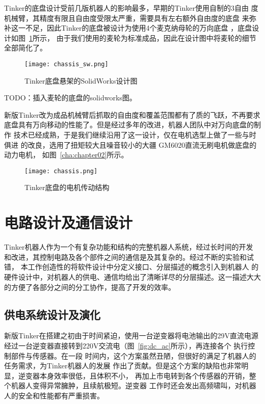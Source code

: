 Tinker的底盘设计受前几版机器人的影响最多，早期的Tinker使用自制的3自由
度机械臂，其精度有限且自由度受限太严重，需要具有左右额外自由度的底盘
来弥补这一不足，因此Tinker的底盘被设计为使用4个麦克纳母轮的万向底盘
\cite{tlale2008kinematics}，底盘设计如图~\ref{fig:chassis_sw}所示，
由于我们使用的麦轮为标准成品，因此在设计图中将麦轮的细节全部简化了。

\begin{figure}[ht] %
  \centering
  \texttt{[image: chassis\_sw.png]}
  \caption{Tinker底盘悬架的SolidWorks设计图}
  \label{fig:chassis_sw}
\end{figure}

TODO：插入麦轮的底盘的solidworks图。

新版Tinker改为成品机械臂后抓取的自由度和覆盖范围都有了质的飞跃，不再要求
底盘具有万向移动的性能了。但是经过多年的改进，机器人团队中对万向底盘的制作
技术已经成熟，于是我们继续沿用了这一设计，仅在电机选型上做了一些与时俱进
的改良，选用了扭矩较大且噪音较小的大疆 GM6020直流无刷电机做底盘的动力电机，
如图~\ref{cha:chapter02}所示。

\begin{figure}[ht] %
  \centering
  \texttt{[image: chassis.png]}
  \caption{Tinker底盘的电机传动结构}
  \label{fig:chassis}
\end{figure}


\section{电路设计及通信设计}

Tinker机器人作为一个有复杂功能和结构的完整机器人系统，经过长时间的开发
和改进，其控制电路及各个部件之间的通信是及其复杂的。经过不断的实验和试错，
本工作创造性的将软件设计中分定义接口、分层描述的概念引入到机器人
的硬件设计中，对机器人的供电、通信均给出了清晰详尽的分层描述。这一描述大大
的方便了各部分之间的分工协作，提高了开发的效率。

\subsection{供电系统设计及演化}

新版Tinker在搭建之初由于时间紧迫，使用一台逆变器将电池输出的29V直流电源
经过一台逆变器直接转到220V交流电（图~\ref{fig:dc_ac}所示），再连接各个
执行控制部件与传感器。在一段
时间内，这个方案虽然丑陋，但很好的满足了机器人的任务需求，为Tinker机器人的发展
作出了贡献。但是这个方案的缺陷也非常明显，逆变器本身效率很低，且体积不小，
再加上市电转到各个传感器的开销，整个机器人变得异常臃肿，且续航极短。逆变器
工作时还会发出高频啸叫，对机器人的安全和性能都有严重损害。

